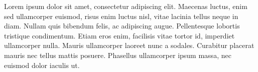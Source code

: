 \documentclass[12pt,journal,compsoc]{IEEEtran}
\begin{document}

Lorem ipsum dolor sit amet, consectetur adipiscing elit. Maecenas luctus, enim sed ullamcorper euismod, risus enim luctus nisl, vitae lacinia tellus neque in diam. Nullam quis bibendum felis, ac adipiscing augue. Pellentesque lobortis tristique condimentum. Etiam eros enim, facilisis vitae tortor id, imperdiet ullamcorper nulla. Mauris ullamcorper laoreet nunc a sodales. Curabitur placerat mauris nec tellus mattis posuere. Phasellus ullamcorper ipsum massa, nec euismod dolor iaculis ut.
\end{document}
